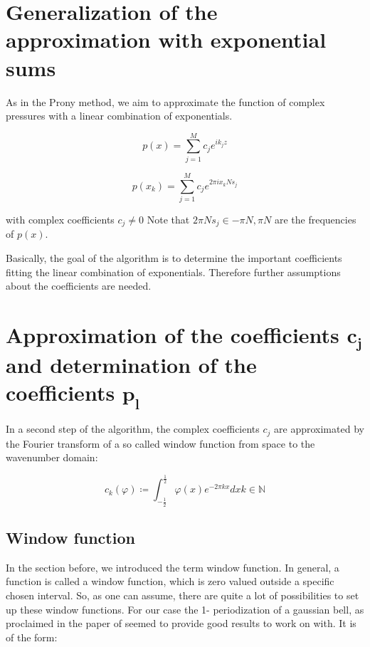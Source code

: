 \documentclass[11pt]{report} %
\begin{document}
\section{Generalization of the approximation with exponential sums}
As in the Prony method, we aim to approximate the function of complex pressures with a linear combination of exponentials.

\begin{equation}
 p(x)=\sum\limits_{j=1}^M c_{j}e^{ik_{j}z} 
\end{equation}

\begin{equation} \label{eqn: nonequi exp}
 p(x_{k})=\sum\limits_{j=1}^M c_{j}e^{2\pi ix_{k}Ns_{j}} 
\end{equation}

with complex coefficients $c_{j} \neq 0$
Note that $2 \pi Ns_j \in{-\pi N,\pi N}$ are the frequencies of $p(x)$.

Basically, the goal of the algorithm is to determine the important coefficients fitting the linear combination of exponentials.
Therefore further assumptions about the coefficients are needed.  

\section{Approximation of the coefficients $\bm{c_j}$ and determination of the coefficients $\bm{p_l}$}
In a second step of the algorithm, the complex coefficients $c_j$ are approximated by the Fourier transform of a so called window function from space to the wavenumber domain: 

\begin{equation}
c_{k} (\varphi) \coloneqq \int_{-\frac{1}{2}}^{\frac{1}{2}} \varphi (x) e^{-2 \pi kx} dx         
k \in \mathbb{N}
\end{equation}

\subsection{Window function}
In the section before, we introduced the term window function.
In general, a function is called a window function, which is zero valued outside a specific chosen interval.
So, as one can assume, there are quite a lot of possibilities to set up these window functions.
For our case the 1- periodization of a gaussian bell, as proclaimed in the paper of \cite{Peter2011} seemed to provide good results to work on with.
It is of the form: 
\end{document}
